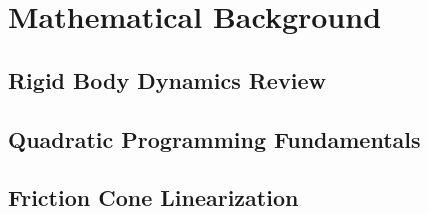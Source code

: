 \chapter{Mathematical Background}
\label{app:math}

\section{Rigid Body Dynamics Review}
\lipsum[49]

\section{Quadratic Programming Fundamentals}
\lipsum[50]

\section{Friction Cone Linearization}
\lipsum[51]
